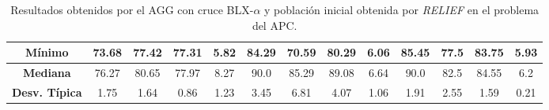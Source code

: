 \documentclass[11pt,a4paper]{article}
\begin{document}
\begin{table}[H]
{\begin{tabular}{c|c|c|c|c|c|c|c|c|c|c|c|c|}
\multicolumn{1}{|c|}{\textbf{Mínimo}}       & 73.68             & 77.42                   & 77.31         & 5.82       & 84.29             & 70.59          & 80.29         & 6.06       & 85.45             & 77.5           & 83.75         & 5.93       \\ \hline
\multicolumn{1}{|c|}{\textbf{Mediana}}      & 76.27             & 80.65                   & 77.97         & 8.27       & 90.0              & 85.29          & 89.08         & 6.64       & 90.0              & 82.5           & 84.55         & 6.2        \\ \hline
\multicolumn{1}{|c|}{\textbf{Desv. Típica}} & 1.75              & 1.64                    & 0.86          & 1.23       & 3.45              & 6.81           & 4.07          & 1.06       & 1.91              & 2.55           & 1.59          & 0.21       \\ \hline
\end{tabular}
}%
\caption{Resultados obtenidos por el AGG con cruce BLX-$\alpha$ y población inicial obtenida por \textit{RELIEF} en el problema
del APC.}
\end{table}
\end{document}
